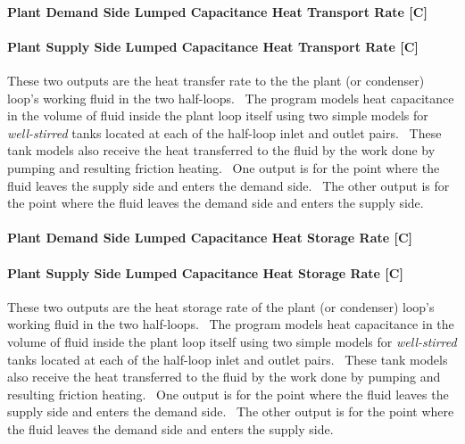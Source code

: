 \paragraph{Plant Demand Side Lumped Capacitance Heat Transport Rate {[}C{]}}\label{plant-demand-side-lumped-capacitance-heat-transport-rate-w}

\paragraph{Plant Supply Side Lumped Capacitance Heat Transport Rate {[}C{]}}\label{plant-supply-side-lumped-capacitance-heat-transport-rate-w}

These two outputs are the heat transfer rate to the the plant (or condenser) loop's working fluid in the two half-loops.~ The program models heat capacitance in the volume of fluid inside the plant loop itself using two simple models for \textit{well-stirred} tanks located at each of the half-loop inlet and outlet pairs.~ These tank models also receive the heat transferred to the fluid by the work done by pumping and resulting friction heating.~ One output is for the point where the fluid leaves the supply side and enters the demand side.~ The other output is for the point where the fluid leaves the demand side and enters the supply side.

\paragraph{Plant Demand Side Lumped Capacitance Heat Storage Rate {[}C{]}}\label{plant-demand-side-lumped-capacitance-heat-storage-rate-w}

\paragraph{Plant Supply Side Lumped Capacitance Heat Storage Rate {[}C{]}}\label{plant-supply-side-lumped-capacitance-heat-storage-rate-w}

These two outputs are the heat storage rate of the plant (or condenser) loop's working fluid in the two half-loops.~ The program models heat capacitance in the volume of fluid inside the plant loop itself using two simple models for \textit{well-stirred} tanks located at each of the half-loop inlet and outlet pairs.~ These tank models also receive the heat transferred to the fluid by the work done by pumping and resulting friction heating.~ One output is for the point where the fluid leaves the supply side and enters the demand side.~ The other output is for the point where the fluid leaves the demand side and enters the supply side.

